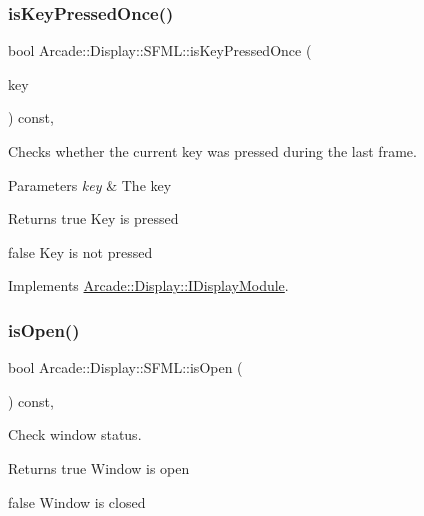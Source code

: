 \subsubsection{\texorpdfstring{isKeyPressedOnce()}{isKeyPressedOnce()}}
{\footnotesize\ttfamily bool Arcade\+::\+Display\+::\+S\+F\+M\+L\+::is\+Key\+Pressed\+Once (\begin{DoxyParamCaption}\item[{\mbox{\hyperlink{classArcade_1_1Display_1_1IDisplayModule_a8da3f6b309ca0581473ae8cc8789b619}{I\+Display\+Module\+::\+Keys}}}]{key }\end{DoxyParamCaption}) const\hspace{0.3cm}{\ttfamily [final]}, {\ttfamily [virtual]}}



Checks whether the current key was pressed during the last frame. 


\begin{DoxyParams}{Parameters}
{\em key} & The key \\
\hline
\end{DoxyParams}
\begin{DoxyReturn}{Returns}
true Key is pressed 

false Key is not pressed 
\end{DoxyReturn}


Implements \mbox{\hyperlink{classArcade_1_1Display_1_1IDisplayModule_a531b700b332e077d9b714bafac05ebe1}{Arcade\+::\+Display\+::\+I\+Display\+Module}}.

\mbox{\label{classArcade_1_1Display_1_1SFML_a77be7097a8ed969dcf1fca6f960d0c4c}} 
\subsubsection{\texorpdfstring{isOpen()}{isOpen()}}
{\footnotesize\ttfamily bool Arcade\+::\+Display\+::\+S\+F\+M\+L\+::is\+Open (\begin{DoxyParamCaption}{ }\end{DoxyParamCaption}) const\hspace{0.3cm}{\ttfamily [final]}, {\ttfamily [virtual]}}



Check window status. 

\begin{DoxyReturn}{Returns}
true Window is open 

false Window is closed 
\end{DoxyReturn}


